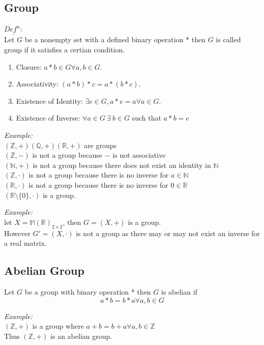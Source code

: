 \documentclass[11pt,letterpaper]{article}
\newenvironment{example}                             
        {\noindent\textit{Example:}\\}
	{}
\newenvironment{definition}
	{\begin{mdframed}$\underline{\textit{Def}^\textit{n}:} $\\}
	{\end{mdframed}}
\begin{document}
\subsection{Group}

\begin{definition}
  Let $G$ be a nonempty set with a defined binary operation $*$ then $G$ is called group if it satisfies a certian condition. 
  \begin{enumerate}
    \item Closure: $a*b \in G \forall a,b \in G$.
    \item Associativity: $(a*b)*c = a*(b*c)$.
    \item Existence of Identity: $\exists e \in G, a*e = a \forall a \in G$.
    \item Existence of Inverse: $\forall a \in G\ \exists\ b \in G$ such that $a*b = e$
  \end{enumerate}
\end{definition}

\begin{example}
  $(\mathbb{Z},+)(\mathbb{Q},+)(\mathbb{R},+)$ are groups\\
  $(\mathbb{Z},-)$ is not a group because $-$ is not associative\\
  $(\mathbb{N},+)$ is not a group because there does not exist an identity in $\mathbb{N}$\\ 
  $(\mathbb{Z},\cdot)$ is not a group because there is no inverse for $a \in \mathbb{N}$\\
  $(\mathbb{R},\cdot)$ is not a group because there is no inverse for $0 \in \mathbb{R}$\\
  $(\mathbb{R}\setminus \{0\},\cdot)$ is a group. 
\end{example}

\begin{example}
  let $X = \mathbb{M}(\mathbb{R})_{2\times 2}$, then $G = (X, +)$ is a group.\\ 
  However $G' = (X, \cdot)$ is not a group as there may or may not exist an inverse for a real matrix.
\end{example}

\subsection{Abelian Group}
Let $G$ be a group with binary operation * then $G$ is abelian if 
\[
  a*b = b*a \forall a,b \in G
\]

\begin{example}
  $(\mathbb{Z}, +)$ is a group where $a + b = b + a \forall a,b \in \mathbb{Z}$ \\
  Thus $(\mathbb{Z}, +)$ is an abelian group.
\end{example}
\end{document}

